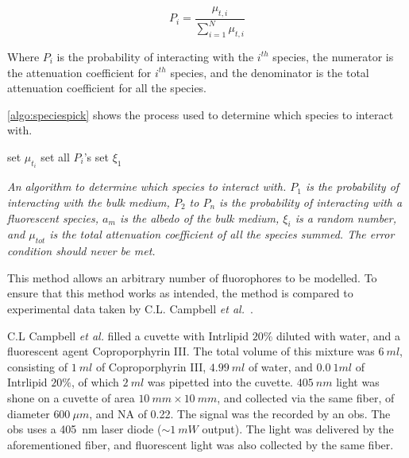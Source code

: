 \begin{equation}
P_i=\frac{\mu_{t,i}}{\sum\limits_{i=1}^{N} \mu_{t,i}}
\label{eqn:totspec}
\end{equation}

Where $P_i$ is the probability of interacting with the $i^{th}$ species, the numerator is the attenuation coefficient for $i^{th}$ species, and the denominator is the total attenuation coefficient for all the species.

\cref{algo:speciespick} shows the process used to determine which species to interact with.

\begin{center}
\begin{algorithm}[H]
\SetAlgoLined
  set $\mu_{t_{i}}$\;
  set all $P_i$'s\;
  set $\xi_1$\;
\
\caption{\textit{An algorithm to determine which species to interact with. $P_1$ is the probability of interacting with the bulk medium, $P_2$ to $P_n$ is the probability of interacting with a fluorescent species, $a_m$ is the albedo of the bulk medium, $\xi_i$ is a random number, and $\mu_{tot}$ is the total attenuation coefficient of all the species summed. The error condition should never be met.}}
\label{algo:speciespick}
\end{algorithm}
\end{center}

This method allows an arbitrary number of fluorophores to be modelled.
To ensure that this method works as intended, the method is compared to experimental data taken by C.L. Campbell \textit{et al.}~\cite{louisethesis}.

C.L Campbell \textit{et al.} filled a cuvette with Intrlipid $20\%$ diluted with water, and a fluorescent agent Coproporphyrin III\@.
The total volume of this mixture was $6~ml$, consisting of $1~ml$ of Coproporphyrin III, $4.99~ml$ of water, and $0.0~1ml$ of Intrlipid $20\%$, of which $2~ml$ was pipetted into the cuvette.
$405~nm$ light was shone on a cuvette of area $10~mm \times 10~mm$, and collected via the same fiber, of diameter $600~\mu m$, and NA of 0.22.
The signal was the recorded by an \gls*{obs}.
The \gls*{obs} uses a 405~nm laser diode ($\sim1~mW$ output).
The light was delivered by the aforementioned fiber, and fluorescent light was also collected by the same fiber.


